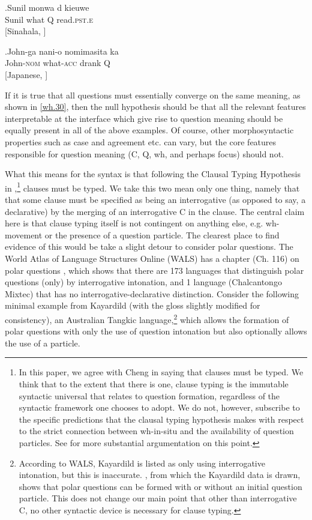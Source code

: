 \documentclass[11pt]{article}
\begin{document}
\exg.\label{wh.90}Sunil mon{\textschwa}wa {d\textschwa} kieuwe \\
  Sunil what Q read.\textsc{pst.e} \\
  \hspace{\fill}[Sinahala, \cite{slade:2011}]

\exg.\label{wh.100}John-ga nani-o nomimasita ka \\
  John-\textsc{nom} what-\textsc{acc} drank Q \\
  \hspace{\fill}[Japanese, \cite{hagstrom:1998}]

If it is true that all questions must essentially converge on the same meaning, as shown in \ref{wh.30}, then the null hypothesis should be that all the relevant features interpretable at the interface which give rise to question meaning should be equally present in all of the above examples. Of course, other morphosyntactic properties such as case and agreement etc. can vary, but the core features responsible for question meaning (C, Q, wh, and perhaps focus) should not.

What this means for the syntax is that following the Clausal Typing Hypothesis in \cite{cheng:1997},\footnote{In this paper, we agree with Cheng in saying that clauses must be typed. We think that to the extent that there is one, clause typing is the immutable syntactic universal that relates to question formation, regardless of the syntactic framework one chooses to adopt. We do not, however, subscribe to the specific predictions that the clausal typing hypothesis makes with respect to the strict connection between wh-in-situ and the availability of question particles. See \cite{bruening:2007} for more substantial argumentation on this point.} clauses must be typed. We take this two mean only one thing, namely that that some clause must be specified as being an interrogative (as opposed to say, a declarative) by the merging of an interrogative C in the clause. The central claim here is that clause typing itself is not contingent on anything else, e.g. wh-movement or the presence of a question particle. The clearest place to find evidence of this would be take a slight detour to consider polar questions. The World Atlas of Language Structures Online (WALS) has a chapter (Ch. 116) on polar questions \citep{wals116:2013}, which shows that there are 173 languages that distinguish polar questions (only) by interrogative intonation, and 1 language (Chalcantongo Mixtec) that has no interrogative-declarative distinction. Consider the following minimal example from Kayardild (with the gloss slightly modified for consistency), an Australian Tangkic language,\footnote{According to WALS, Kayardild is listed as only using interrogative intonation, but this is inaccurate. \cite{evans:1995}, from which the Kayardild data is drawn, shows that polar questions can be formed with or without an initial question particle. This does not change our main point that other than interrogative C, no other syntactic device is necessary for clause typing.} which allows the formation of polar questions with only the use of question intonation but also optionally allows the use of a particle.
\end{document}
